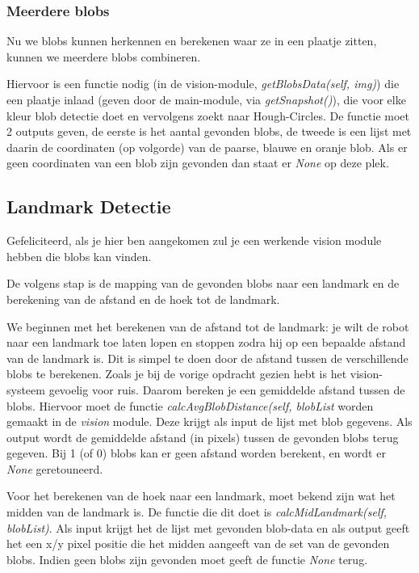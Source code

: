 \documentclass[a4paper]{article}
\begin{document}
\subsubsection{Meerdere blobs}
Nu we blobs kunnen herkennen en berekenen waar ze in een plaatje zitten, kunnen we meerdere blobs combineren.

Hiervoor is een functie nodig (in de vision-module, \textit{getBlobsData(self, img)}) die een plaatje inlaad (geven door de main-module, via \textit{getSnapshot()}), die voor elke kleur blob detectie doet en vervolgens zoekt  naar Hough-Circles. De functie moet 2 outputs geven, de eerste is het aantal gevonden blobs, de tweede is een lijst met daarin de coordinaten (op volgorde) van de paarse, blauwe en oranje blob. Als er geen coordinaten van een blob zijn gevonden dan staat er \textit{None} op deze plek. 

\subsection{Landmark Detectie}
Gefeliciteerd, als je hier ben aangekomen zul je een werkende vision module hebben die blobs kan vinden.

De volgens stap is de mapping van de gevonden blobs naar een landmark en de berekening van de afstand en de hoek tot de landmark.

We beginnen met het berekenen van de afstand tot de landmark: je wilt de robot naar een landmark toe laten lopen en stoppen zodra hij op een bepaalde afstand van de landmark is. Dit is simpel te doen door de afstand tussen de verschillende blobs te berekenen. Zoals je bij de vorige opdracht gezien hebt is het vision-systeem gevoelig voor ruis. Daarom bereken je een gemiddelde afstand tussen de blobs. Hiervoor moet de functie \textit{calcAvgBlobDistance(self, blobList} worden gemaakt in de \textit{vision} module. Deze krijgt als input de lijst met blob gegevens. Als output wordt de gemiddelde afstand (in pixels) tussen de gevonden blobs terug gegeven. Bij 1 (of 0) blobs kan er geen afstand worden berekent, en wordt er \textit{None} geretouneerd.

Voor het berekenen van de hoek naar een landmark, moet bekend zijn wat het midden van de landmark is. De functie die dit doet is \textit{calcMidLandmark(self, blobList)}. Als input krijgt het de lijst met gevonden blob-data en als output geeft het een x/y pixel positie die het midden aangeeft van de set van de gevonden blobs. Indien geen blobs zijn gevonden moet geeft de functie \textit{None} terug.
\end{document}
